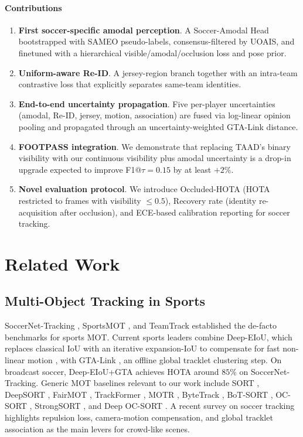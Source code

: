 \documentclass[conference]{IEEEtran}
\begin{document}
\paragraph*{Contributions}
\begin{enumerate}
  \item \textbf{First soccer-specific amodal perception}. A Soccer-Amodal Head bootstrapped with SAMEO pseudo-labels, consensus-filtered by UOAIS, and finetuned with a hierarchical visible/amodal/occlusion loss and pose prior.
  \item \textbf{Uniform-aware Re-ID}. A jersey-region branch together with an intra-team contrastive loss that explicitly separates same-team identities.
  \item \textbf{End-to-end uncertainty propagation}. Five per-player uncertainties (amodal, Re-ID, jersey, motion, association) are fused via log-linear opinion pooling and propagated through an uncertainty-weighted GTA-Link distance.
  \item \textbf{FOOTPASS integration}. We demonstrate that replacing TAAD's binary visibility with our continuous visibility plus amodal uncertainty is a drop-in upgrade expected to improve F1@$\tau=0.15$ by at least $+2\%$.
  \item \textbf{Novel evaluation protocol}. We introduce Occluded-HOTA (HOTA restricted to frames with visibility $\leq 0.5$), Recovery rate (identity re-acquisition after occlusion), and ECE-based calibration reporting for soccer tracking.
\end{enumerate}

\section{Related Work}
\label{sec:related}

\subsection{Multi-Object Tracking in Sports}
SoccerNet-Tracking \cite{soccernettracking}, SportsMOT \cite{sportsmot}, and TeamTrack \cite{teamtrack} established the de-facto benchmarks for sports MOT. Current sports leaders combine Deep-EIoU, which replaces classical IoU with an iterative expansion-IoU to compensate for fast non-linear motion \cite{deepeiou}, with GTA-Link \cite{gtatrack}, an offline global tracklet clustering step. On broadcast soccer, Deep-EIoU+GTA achieves HOTA around $85\%$ on SoccerNet-Tracking. Generic MOT baselines relevant to our work include SORT \cite{sort}, DeepSORT \cite{deepsort}, FairMOT \cite{fairmot}, TrackFormer \cite{trackformer}, MOTR \cite{motr}, ByteTrack \cite{bytetrack}, BoT-SORT \cite{botsort}, OC-SORT \cite{ocsort}, StrongSORT \cite{strongsort}, and Deep OC-SORT \cite{deepocsort}. A recent survey on soccer tracking \cite{soccersurvey} highlights repulsion loss, camera-motion compensation, and global tracklet association as the main levers for crowd-like scenes.
\end{document}
